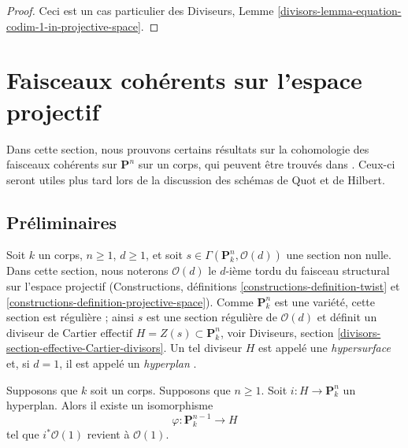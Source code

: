 \begin{proof}
Ceci est un cas particulier des Diviseurs, Lemme
\ref{divisors-lemma-equation-codim-1-in-projective-space}.
\end{proof}




\section{Faisceaux cohérents sur l'espace projectif}
\label{section-coherent-Pn}

\noindent
Dans cette section, nous prouvons certains résultats sur la
cohomologie des faisceaux cohérents sur $\mathbf{P}^n$ sur un
corps, qui peuvent être trouvés dans \cite{Mum}. Ceux-ci seront
utiles plus tard lors de la discussion des schémas de Quot et de Hilbert.

\subsection{Préliminaires}
\label{subsection-preliminaries}

\noindent
Soit $k$ un corps, $n \geq 1$, $d \geq 1$, et soit $s \in
\Gamma(\mathbf{P}_k^n, \mathcal{O}(d))$ une section non
nulle. Dans cette section, nous noterons $\mathcal{O}(d)$ le
$d$-ième tordu du faisceau structural sur l'espace projectif
(Constructions, définitions
\ref{constructions-definition-twist} et
\ref{constructions-definition-projective-space}). Comme $\mathbf{P}^n_k$
est une variété, cette section est régulière ; ainsi $s$ est une section
régulière de $\mathcal{O}(d)$ et définit un diviseur de Cartier effectif
$H = Z(s) \subset \mathbf{P}^n_k$, voir Diviseurs, section
\ref{divisors-section-effective-Cartier-divisors}. Un tel diviseur $H$ est
appelé une {\it hypersurface } et, si $d = 1$, il est appelé un {\it hyperplan }.

\begin{lemma}
\label{lemma-hyperplane}
Supposons que $k$ soit un corps. Supposons
que $n \geq 1$. Soit $i : H \to \mathbf{P}^n_k$
un hyperplan. Alors il existe un isomorphisme
$$
\varphi : \mathbf{P}^{n - 1}_k \longrightarrow H
$$
tel que $i^*\mathcal{O}(1)$ revient à $\mathcal{O}(1)$.
\end{lemma}

